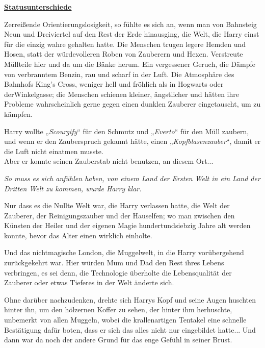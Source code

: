 

\hypertarget{statusunterschiede}{%

\textbf{\uline{Statusunterschiede}}

\hfill\break Zerreißende Orientierungslosigkeit, so fühlte es sich an, wenn man von Bahnsteig Neun und Dreiviertel auf den Rest der Erde hinausging, die Welt, die Harry einst für die einzig wahre gehalten hatte. Die Menschen trugen legere Hemden und Hosen, statt der würdevolleren Roben von Zauberern und Hexen. Verstreute Müllteile hier und da um die Bänke herum. Ein vergessener Geruch, die Dämpfe von verbranntem Benzin, rau und scharf in der Luft. Die Atmosphäre des Bahnhofs King's Cross, weniger hell und fröhlich als in Hogwarts oder derWinkelgasse; die Menschen schienen kleiner, ängstlicher und hätten ihre Probleme wahrscheinlich gerne gegen einen dunklen Zauberer eingetauscht, um zu kämpfen.

Harry wollte „\emph{Scourgify}“ für den Schmutz und „\emph{Everto}“ für den Müll zaubern, und wenn er den Zauberspruch gekannt hätte, einen „\emph{Kopfblasenzauber}“, damit er die Luft nicht einatmen musste.\\ Aber er konnte seinen Zauberstab nicht benutzen, an diesem Ort...

\emph{So muss es sich anfühlen haben, von einem Land der Ersten Welt in ein Land der Dritten Welt zu kommen, wurde Harry klar.}

Nur dass es die Nullte Welt war, die Harry verlassen hatte, die Welt der Zauberer, der Reinigungszauber und der Hauselfen; wo man zwischen den Künsten der Heiler und der eigenen Magie hundertundsiebzig Jahre alt werden konnte, bevor das Alter einen wirklich einholte.

Und das nichtmagische London, die Muggelwelt, in die Harry vorübergehend zurückgekehrt war. Hier würden Mum und Dad den Rest ihres Lebens verbringen, es sei denn, die Technologie überholte die Lebensqualität der Zauberer oder etwas Tieferes in der Welt änderte sich.

Ohne darüber nachzudenken, drehte sich Harrys Kopf und seine Augen huschten hinter ihn, um den hölzernen Koffer zu sehen, der hinter ihm herhuschte, unbemerkt von allen Muggeln, wobei die krallenartigen Tentakel eine schnelle Bestätigung dafür boten, dass er sich das alles nicht nur eingebildet hatte... Und dann war da noch der andere Grund für das enge Gefühl in seiner Brust.

}
